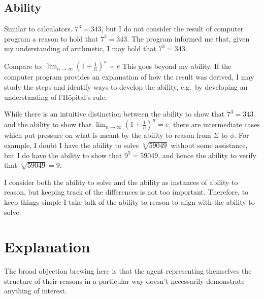 \documentclass[10pt]{article}
\begin{document}
\subsection{Ability}
\label{sec:ability}

\begin{note}
  Similar to calculators.
  \(7^{3} = 343\), but I do not consider the result of computer program a reason to hold that \(7^{3} = 343\).
  The program informed me that, given my understanding of arithmetic, I may hold that \(7^{3} = 343\).

  Compare to:
  \(\lim_{n \to \infty}\left(1 + \frac{1}{n} \right)^{n} = e\)
  This goes beyond my ability.
  If the computer program provides an explanation of how the result was derived, I may study the steps and identify ways to develop the ability, e.g.\ by developing an understanding of l'H\^{o}pital's rule.

  While there is an intuitive distinction between the ability to show that \(7^{3} = 343\) and the ability to show that \(\lim_{n \to \infty}\left(1 + \frac{1}{n} \right)^{n} = e\), there are intermediate cases which put pressure on what is meant by the ability to reason from \(\Sigma\) to \(\phi\).
  For example, I doubt I have the ability to solve \(\sqrt[5]{59049}\) without some assistance, but I do have the ability to show that \(9^{5} = 59049\), and hence the ability to verify that \(\sqrt[5]{59049} = 9\).

  I consider both the ability to solve and the ability as instances of ability to reason, but keeping track of the differences is not too important.
  Therefore, to keep things simple I take talk of the ability to reason to align with the ability to solve.
\end{note}


\section{Explanation}
\label{sec:explanation-1}

The broad objection brewing here is that the agent representing themselves the structure of their reasons in a particular way doesn't necessarily demonstrate anything of interest.
\end{document}
